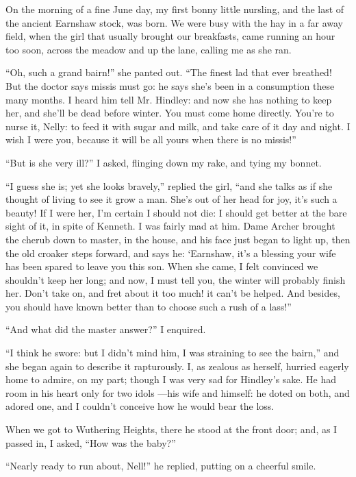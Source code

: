 \par On the morning of a fine June day, my first bonny little nursling, and the last of the ancient Earnshaw stock, was born. We were busy with the hay in a far away field, when the girl that usually brought our breakfasts, came running an hour too soon, across the meadow and up the lane, calling me as she ran.
\par “Oh, such a grand bairn!” she panted out. “The finest lad that ever breathed! But the doctor says missis must go: he says she's been in a consumption these many months. I heard him tell Mr. Hindley: and now she has nothing to keep her, and she'll be dead before winter. You must come home directly. You're to nurse it, Nelly: to feed it with sugar and milk, and take care of it day and night. I wish I were you, because it will be all yours when there is no missis!”
\par “But is she very ill?” I asked, flinging down my rake, and tying my bonnet.
\par “I guess she is; yet she looks bravely,” replied the girl, “and she talks as if she thought of living to see it grow a man. She's out of her head for joy, it's such a beauty! If I were her, I'm certain I should not die: I should get better at the bare sight of it, in spite of Kenneth. I was fairly mad at him. Dame Archer brought the cherub down to master, in the house, and his face just began to light up, then the old croaker steps forward, and says he: ‘Earnshaw, it's a blessing your wife has been spared to leave you this son. When she came, I felt convinced we shouldn't keep her long; and now, I must tell you, the winter will probably finish her. Don't take on, and fret about it too much! it can't be helped. And besides, you should have known better than to choose such a rush of a lass!”
\par “And what did the master answer?” I enquired.
\par “I think he swore: but I didn't mind him, I was straining to see the bairn,” and she began again to describe it rapturously. I, as zealous as herself, hurried eagerly home to admire, on my part; though I was very sad for Hindley's sake. He had room in his heart only for two idols —his wife and himself: he doted on both, and adored one, and I couldn't conceive how he would bear the loss.
\par When we got to Wuthering Heights, there he stood at the front door; and, as I passed in, I asked, “How was the baby?”
\par “Nearly ready to run about, Nell!” he replied, putting on a cheerful smile.
